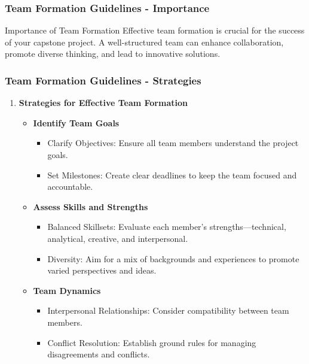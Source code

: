 \documentclass[aspectratio=169]{beamer}
\begin{document}
\begin{frame}[fragile]
    \frametitle{Team Formation Guidelines - Importance}
    \begin{block}{Importance of Team Formation}
        Effective team formation is crucial for the success of your capstone project. A well-structured team can enhance collaboration, promote diverse thinking, and lead to innovative solutions.
    \end{block}
\end{frame}

\begin{frame}[fragile]
    \frametitle{Team Formation Guidelines - Strategies}
    \begin{enumerate}
        \item \textbf{Strategies for Effective Team Formation}
        \begin{itemize}
            \item \textbf{Identify Team Goals}
            \begin{itemize}
                \item Clarify Objectives: Ensure all team members understand the project goals.
                \item Set Milestones: Create clear deadlines to keep the team focused and accountable.
            \end{itemize}
            \item \textbf{Assess Skills and Strengths}
            \begin{itemize}
                \item Balanced Skillsets: Evaluate each member's strengths—technical, analytical, creative, and interpersonal.
                \item Diversity: Aim for a mix of backgrounds and experiences to promote varied perspectives and ideas.
            \end{itemize}
            \item \textbf{Team Dynamics}
            \begin{itemize}
                \item Interpersonal Relationships: Consider compatibility between team members.
                \item Conflict Resolution: Establish ground rules for managing disagreements and conflicts.
            \end{itemize}
        \end{itemize}
    \end{enumerate}
\end{frame}
\end{document}
